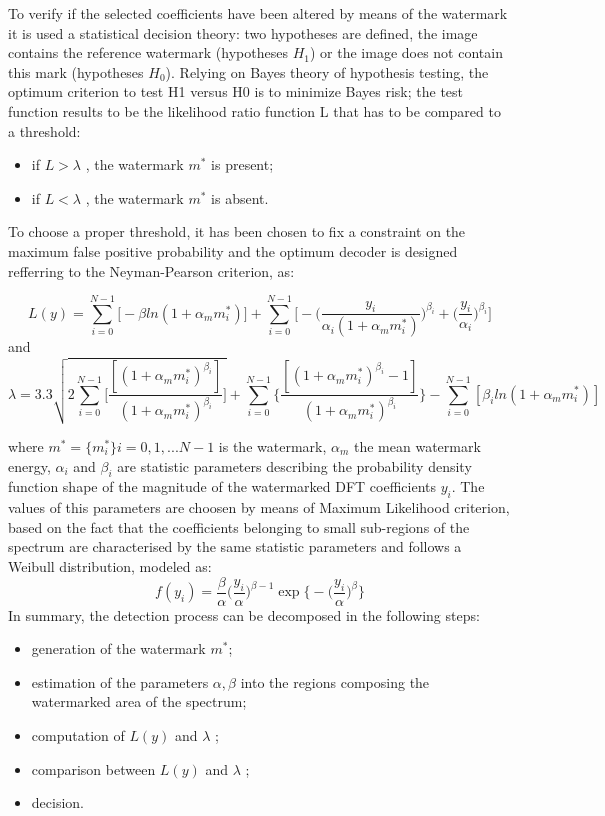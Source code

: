 To verify if the selected coefficients have been altered by means of the watermark it is used a statistical decision theory: two hypotheses are defined, the image contains the reference watermark (hypotheses $H_{1}$) or the image does not contain this mark (hypotheses $H_{0}$). Relying on Bayes theory of hypothesis testing, the optimum criterion to test H1 versus H0 is to minimize Bayes risk; the test function results to be the likelihood ratio function L that has to be compared to a threshold:\newline
\begin{itemize}
\item if $L > \lambda$ ,  the watermark $m^{*}$ is present;
\item if $L < \lambda$ , the watermark  $m^{*}$ is absent.
\end{itemize}

To choose a proper threshold, it has been chosen to fix a constraint on the maximum false positive probability and the optimum decoder is designed refferring to the Neyman-Pearson criterion, as: \newline

$$ L(y)=\sum_{i=0}^{N-1} \Big[-\beta ln(1+\alpha_{m}m_{i}^{*})\Big]+\sum_{i=0}^{N-1}\Big[-\Big(\frac{y_{i}}{\alpha_{i}(1+\alpha_{m}m_{i}^{*})}\Big)^{\beta_{i}}+\Big(\frac{y_{i}}{\alpha_{i}}\Big)^{\beta_{i}}\Big] $$
and
$$\lambda=3.3\sqrt{2\sum_{i=0}^{N-1}\Big[\frac{[(1+\alpha_{m}m_{i}^{*})^{\beta_{i}}]}{(1+\alpha_{m}m_{i}^{*})^{\beta_{i}}}\Big]} + \sum_{i=0}^{N-1}\Big\{\frac{[(1+\alpha_{m}m_{i}^{*})^{\beta_{i}}-1]}{(1+\alpha_{m}m_{i}^{*})^{\beta_{i}}}\Big\} - \sum_{i=0}^{N-1}[\beta_{i}ln(1+\alpha_{m}m_{i}^{*})]$$

where  $m^{*} = \{ m^{*}_{i} \} i= 0,1,...N-1$ is the watermark, $\alpha_{m}$ the mean watermark energy, $\alpha_{i}$ and $\beta_{i}$ are statistic parameters describing the probability density function shape of the magnitude of the watermarked DFT coefficients $y_{i}$.\newline 
The values of this parameters are choosen by means of Maximum Likelihood criterion, based on the fact that the coefficients belonging to small
sub-regions of the spectrum are characterised by the same statistic parameters and follows a Weibull distribution, modeled as:
$$ f(y_{i}) = \frac{\beta}{\alpha}\Big(\frac{y_{i}}{\alpha}\Big)^{\beta-1}\exp\Big\{-\Big(\frac{y_{i}}{\alpha}\Big)^{\beta}\Big\}$$
In summary, the detection process can be decomposed in the following steps:
\begin{itemize}
\item generation of the watermark $m^{*}$;
\item estimation of the parameters $\alpha,\beta$ into the regions composing the watermarked area of the spectrum;
\item computation of $L(y)$ and $\lambda$ ;
\item comparison between $L(y)$ and $\lambda$ ;
\item decision.
\end{itemize}

